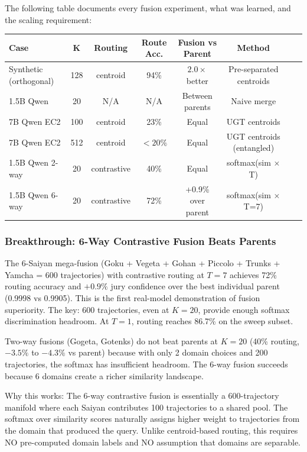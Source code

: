 \documentclass[11pt]{article}
\begin{document}
The following table documents every fusion experiment, what was learned, and the scaling requirement:

\begin{center}
\begin{tabular}{lccccccl}
\toprule
Case & K & Routing & Route Acc. & Fusion vs Parent & Method \\
\midrule
Synthetic (orthogonal) & 128 & centroid & 94\% & $2.0\times$ better & Pre-separated centroids \\
1.5B Qwen & 20 & N/A & N/A & Between parents & Naive merge \\
7B Qwen EC2 & 100 & centroid & 23\% & Equal & UGT centroids \\
7B Qwen EC2 & 512 & centroid & $<20\%$ & Equal & UGT centroids (entangled) \\
1.5B Qwen 2-way & 20 & contrastive & 40\% & Equal & softmax(sim $\times$ T) \\
1.5B Qwen 6-way & 20 & contrastive & 72\% & +0.9\% over parent & softmax(sim $\times$ T=7) \\
\bottomrule
\end{tabular}
\end{center}

\subsubsection*{Breakthrough: 6-Way Contrastive Fusion Beats Parents}

The 6-Saiyan mega-fusion (Goku + Vegeta + Gohan + Piccolo + Trunks + Yamcha = 600 trajectories) with contrastive routing at $T=7$ achieves 72\% routing accuracy and $+0.9\%$ jury confidence over the best individual parent (0.9998 vs 0.9905). This is the first real-model demonstration of fusion superiority. The key: 600 trajectories, even at $K=20$, provide enough softmax discrimination headroom. At $T=1$, routing reaches 86.7\% on the sweep subset.

Two-way fusions (Gogeta, Gotenks) do not beat parents at $K=20$ (40\% routing, $-3.5\%$ to $-4.3\%$ vs parent) because with only 2 domain choices and 200 trajectories, the softmax has insufficient headroom. The 6-way fusion succeeds because 6 domains create a richer similarity landscape.

Why this works: The 6-way contrastive fusion is essentially a 600-trajectory manifold where each Saiyan contributes 100 trajectories to a shared pool. The softmax over similarity scores naturally assigns higher weight to trajectories from the domain that produced the query. Unlike centroid-based routing, this requires NO pre-computed domain labels and NO assumption that domains are separable.
\end{document}
